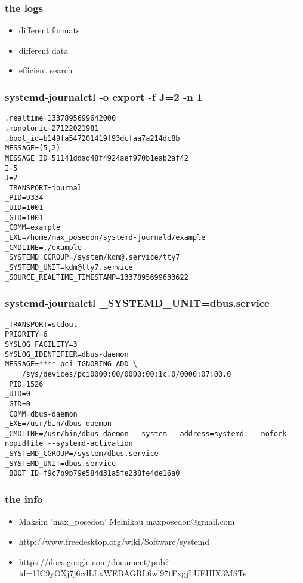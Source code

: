 \documentclass{beamer}
\begin{document}
\begin{frame}[fragile]
    \frametitle{the logs}
    \begin{itemize}
    \item different formats
    \item different data
    \item efficient search
    \end{itemize}
\end{frame}

\begin{frame}[fragile]
    \frametitle{systemd-journalctl -o export -f J=2 -n 1}
    \begin{verbatim}
.realtime=1337895699642000
.monotonic=27122021981
.boot_id=b149fa547201419f93dcfaa7a214dc8b
MESSAGE=(5,2)
MESSAGE_ID=51141ddad48f4924aef970b1eab2af42
I=5
J=2
_TRANSPORT=journal
_PID=9334
_UID=1001
_GID=1001
_COMM=example
_EXE=/home/max_posedon/systemd-journald/example
_CMDLINE=./example
_SYSTEMD_CGROUP=/system/kdm@.service/tty7
_SYSTEMD_UNIT=kdm@tty7.service
_SOURCE_REALTIME_TIMESTAMP=1337895699633622
    \end{verbatim}
\end{frame}

\begin{frame}[fragile]
    \frametitle{systemd-journalctl \_SYSTEMD\_UNIT=dbus.service}
    \begin{verbatim}
_TRANSPORT=stdout
PRIORITY=6
SYSLOG_FACILITY=3
SYSLOG_IDENTIFIER=dbus-daemon
MESSAGE=**** pci IGNORING ADD \
    /sys/devices/pci0000:00/0000:00:1c.0/0000:07:00.0
_PID=1526
_UID=0
_GID=0
_COMM=dbus-daemon
_EXE=/usr/bin/dbus-daemon
_CMDLINE=/usr/bin/dbus-daemon --system --address=systemd: --nofork --nopidfile --systemd-activation
_SYSTEMD_CGROUP=/system/dbus.service
_SYSTEMD_UNIT=dbus.service
_BOOT_ID=f9c7b9b79e584d31a5fe238fe4de16a0
    \end{verbatim}
\end{frame}

\begin{frame}[fragile]
    \frametitle{the info}
    \begin{itemize}
    \item Maksim 'max\_posedon' Melnikau maxposedon@gmail.com
    \item http://www.freedesktop.org/wiki/Software/systemd
    \item https://docs.google.com/document/pub?
        id=1IC9yOXj7j6cdLLxWEBAGRL6wl97tFxgjLUEHIX3MSTs
    \end{itemize}
\end{frame}
\end{document}
